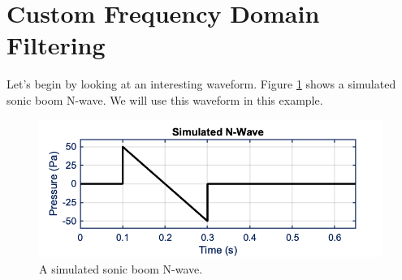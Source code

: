 \section{Custom Frequency Domain Filtering}

Let's begin by looking at an interesting waveform. Figure \ref{fig:Simulated N-Wave} shows a simulated sonic boom N-wave. We will use this waveform in this example.

\begin{figure}[H]
    \centering
    \includegraphics[width = 5 in]{Chapters/Signal Processing/Figures/Simulated N-Wave.png}
    \caption{A simulated sonic boom N-wave.}
    \label{fig:Simulated N-Wave}
\end{figure}